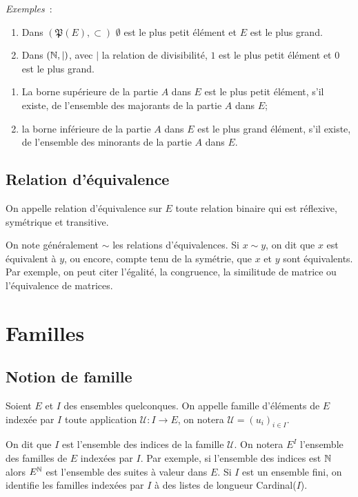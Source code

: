 \emph{Exemples}~:
\begin{enumerate}
    \item Dans \((\mathfrak{P}(E), \subset)\) \(\emptyset\) est le plus petit 
        élément et \(E\) est le plus grand.
    \item Dans \((\mathbb{N},|)\), avec \(|\) la relation de divisibilité, \(1\) est le 
        plus petit élément et \(0\) est le plus grand.
\end{enumerate}
\begin{defdef}
    \begin{enumerate}
        \item La borne supérieure de la partie \(A\) dans \(E\) est le plus 
            petit élément, s'il existe, de l'ensemble des majorants de la partie 
            \(A\) dans \(E\);
        \item la borne inférieure de la partie \(A\) dans \(E\) est le plus 
            grand élément, s'il existe, de l'ensemble des minorants de la partie 
            \(A\) dans \(E\).
    \end{enumerate}
\end{defdef}
\subsection{Relation d'équivalence}
\label{chap3-subsec:relationequivalence}
\begin{defdef}
    On appelle relation d'équivalence sur \(E\) toute relation binaire qui est 
    réflexive, symétrique et transitive.
\end{defdef}
On note généralement \(\sim\) les relations d'équivalences. Si \(x \sim y\), on 
dit que \(x\) est équivalent à \(y\), ou encore, compte tenu de la symétrie, que 
\(x\) et \(y\) sont équivalents. Par exemple, on peut citer l'égalité, la 
congruence, la similitude de matrice ou l'équivalence de matrices.
\section{Familles}
\label{chap3-sec:familles}
\subsection{Notion de famille}
\label{chap3-subsec:notionfamille}
\begin{defdef}
    Soient \(E\) et \(I\) des ensembles quelconques. On appelle famille 
    d'éléments de \(E\) indexée par \(I\) toute application \(\mathcal{U} : I 
    \longrightarrow E\), on notera \(\mathcal{U}=(u_i)_{i \in I}\).
\end{defdef}
On dit que \(I\) est l'ensemble des indices de la famille \(\mathcal{U}\). On notera \(E^I\) l'ensemble des familles de \(E\) indexées par \(I\). Par exemple, si l'ensemble des indices est \(\mathbb{N}\) alors \(E^{\mathbb{N}}\) est l'ensemble des suites à valeur dans \(E\). Si \(I\) est un ensemble fini, on identifie les familles indexées par \(I\) à des listes de longueur Cardinal(\(I\)).
